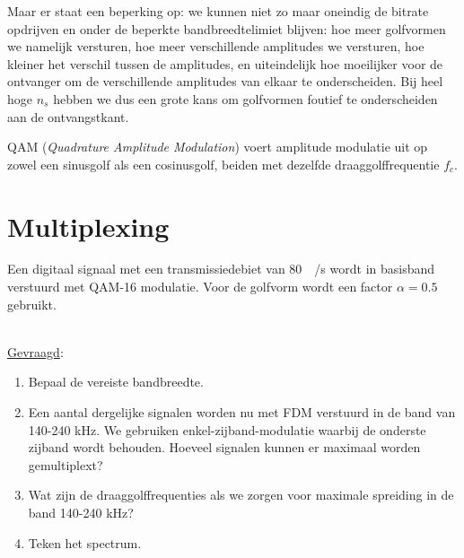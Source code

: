 \documentclass[kulak]{kulakarticle}
\begin{document}
\begin{enumerate}
		Maar er staat een beperking op: we kunnen niet zo maar oneindig de bitrate opdrijven en onder de beperkte bandbreedtelimiet blijven: hoe meer golfvormen we namelijk versturen, hoe meer verschillende amplitudes we versturen, hoe kleiner het verschil tussen de amplitudes, en uiteindelijk hoe moeilijker voor de ontvanger om de verschillende amplitudes van elkaar te onderscheiden. Bij heel hoge \(n_s\) hebben we dus een grote kans om golfvormen foutief te onderscheiden aan de ontvangstkant.

		QAM (\textit{Quadrature Amplitude Modulation}) voert amplitude modulatie uit op zowel een sinusgolf als een cosinusgolf, beiden met dezelfde draaggolffrequentie \(f_c\).

	\end{enumerate}

	\newpage
	\section{Multiplexing}

	Een digitaal signaal met een transmissiedebiet van \SI{80}{\kilo\bit/\second} wordt in basisband verstuurd met
	QAM-16 modulatie. Voor de golfvorm wordt een factor \(\alpha = 0.5\) gebruikt.

	\hfill \\
	\underline{Gevraagd}:
	\begin{enumerate}
		\item Bepaal de vereiste bandbreedte.
		\item Een aantal dergelijke signalen worden nu met FDM verstuurd in de band van 140-240 kHz. We gebruiken enkel-zijband-modulatie waarbij de onderste zijband wordt behouden. Hoeveel signalen kunnen er maximaal worden gemultiplext?
		\item Wat zijn de draaggolffrequenties als we zorgen voor maximale spreiding in de band 140-240 kHz?
		\item Teken het spectrum.
	\end{enumerate}
\end{document}
